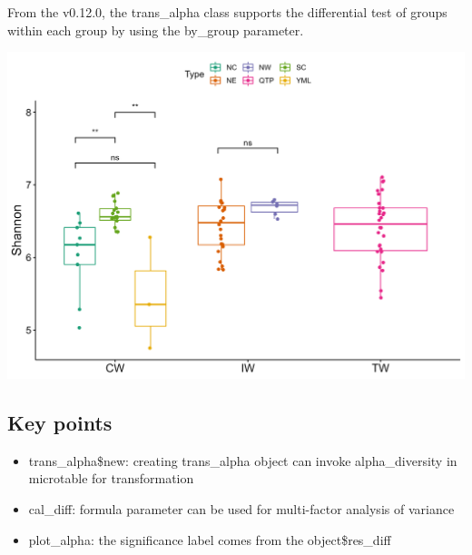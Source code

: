 \documentclass[
]{book}
\newenvironment{Shaded}{\begin{snugshade}}{\end{snugshade}}
\newcommand{\AttributeTok}[1]{\textcolor[rgb]{0.77,0.63,0.00}{#1}}
\newcommand{\FunctionTok}[1]{\textcolor[rgb]{0.00,0.00,0.00}{#1}}
\newcommand{\NormalTok}[1]{#1}
\newcommand{\OtherTok}[1]{\textcolor[rgb]{0.56,0.35,0.01}{#1}}
\newcommand{\SpecialCharTok}[1]{\textcolor[rgb]{0.00,0.00,0.00}{#1}}
\newcommand{\StringTok}[1]{\textcolor[rgb]{0.31,0.60,0.02}{#1}}
\providecommand{\tightlist}{%
  \setlength{\itemsep}{0pt}\setlength{\parskip}{0pt}}
\begin{document}
From the v0.12.0, the trans\_alpha class supports the differential test of groups within each group by using the by\_group parameter.

\begin{Shaded}
\end{Shaded}

\begin{center}\includegraphics[width=600px]{Images/plot_alpha_wilcox_bygroup} \end{center}

\hypertarget{key-points-3}{%
\subsection{Key points}\label{key-points-3}}

\begin{itemize}
\tightlist
\item
  trans\_alpha\$new: creating trans\_alpha object can invoke alpha\_diversity in microtable for transformation
\item
  cal\_diff: formula parameter can be used for multi-factor analysis of variance
\item
  plot\_alpha: the significance label comes from the object\$res\_diff
\end{itemize}
\end{document}
